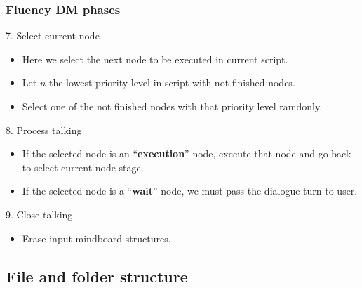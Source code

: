 \documentclass[11pt]{beamer}
\begin{document}
\begin{frame}[fragile]
\frametitle{Fluency DM phases}
	\small
	\begin{block}{7. Select current node}
	\begin{itemize}
		\item Here we select the next node to be executed in current script.
		\item Let $n$ the lowest priority level in script with not finished nodes.
		\item Select one of the not finished nodes with that priority level ramdonly.
	\end{itemize}
	\end{block}
	\pause
	\small
	\begin{block}{8. Process talking}
	\begin{itemize}
		\item If the selected node is an ``\textbf{execution}'' node, execute that node and go back to select current node stage.
		\item If the selected node is a ``\textbf{wait}'' node, we must pass the dialogue turn to user.
	\end{itemize}
	\end{block}
	\pause
	\small
	\begin{block}{9. Close talking}
	\begin{itemize}
		\item Erase input mindboard structures.
	\end{itemize}
	\end{block}

\end{frame}

\subsection{File and folder structure}
\end{document}
